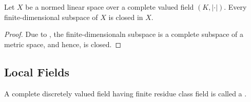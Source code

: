 \begin{corollary}
    Let $X$ be a normed linear space over a complete valued field $(K, |\cdot|)$. Every finite-dimensional subspace of $X$ is closed in $X$.
\end{corollary}
\begin{proof}
    Due to , the finite-dimensionaln subspace is a complete subspace of a metric space, and hence, is closed.
\end{proof}

\subsection{Local Fields}

\begin{definition}
    A complete discretely valued field having finite residue class field is called a .
\end{definition}

